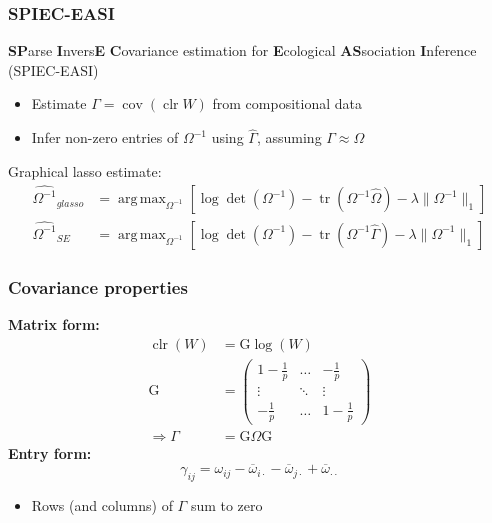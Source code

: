 \documentclass{beamer}
\newcommand{\clr}{\operatorname{clr}}
\newcommand{\cov}{\operatorname{cov}}
\DeclareMathOperator*{\argmax}{arg\,max}
\DeclareMathOperator{\tr}{tr}
\begin{document}
\begin{frame}
\frametitle{SPIEC-EASI}
\textbf{SP}arse \textbf{I}nvers\textbf{E} \textbf{C}ovariance estimation for \textbf{E}cological \textbf{AS}sociation \textbf{I}nference (SPIEC-EASI)
\begin{itemize}
\item Estimate $\Gamma = \cov(\clr W)$ from compositional data
\item Infer non-zero entries of $\Omega^{-1}$ using $\hat{\Gamma}$, assuming $\Gamma \approx \Omega$
\end{itemize}
\pause
Graphical lasso estimate:
\begin{align*}
\widehat{\Omega^{-1}}_{glasso} &= \argmax_{\Omega^{-1}} \left[ \log \det(\Omega^{-1}) - \tr(\Omega^{-1} \widehat{\Omega}) - \lambda \lVert \Omega^{-1} \rVert_1 \right] \\
\widehat{\Omega^{-1}}_{SE} &= \argmax_{\Omega^{-1}} \left[ \log \det(\Omega^{-1}) - \tr(\Omega^{-1} \widehat{\Gamma}) - \lambda \lVert \Omega^{-1} \rVert_1 \right]
\end{align*}
\end{frame}

\begin{frame}
\frametitle{Covariance properties}
\textbf{Matrix form:}
\begin{align*}
\clr(W) &= \text{G} \log(W) \\
\text{G} &=
\begin{pmatrix}
1 - \frac{1}{p} & \dots & -\frac{1}{p} \\
\vdots & \ddots & \vdots \\
-\frac{1}{p} & \dots & 1 - \frac{1}{p}
\end{pmatrix} \\
\Rightarrow \Gamma &= \text{G} \Omega \text{G}
\end{align*}
\pause
\textbf{Entry form:}
\begin{equation*}
\gamma_{ij} = \omega_{ij} - \overline{\omega}_{i\cdot} - \overline{\omega}_{j\cdot} + \overline{\omega}_{\cdot\cdot}
\end{equation*}
\begin{itemize}
\item Rows (and columns) of $\Gamma$ sum to zero
\end{itemize}
\end{frame}
\end{document}
